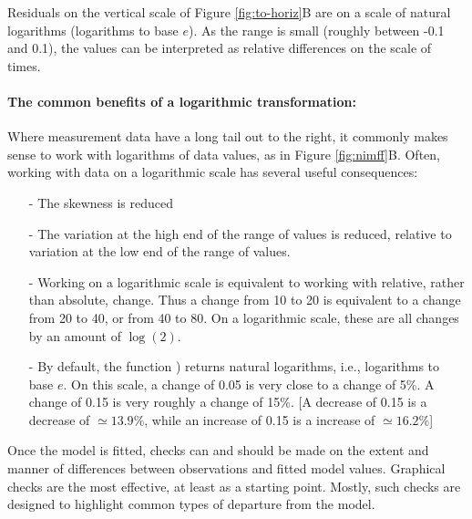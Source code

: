 Residuals on the vertical scale of Figure \ref{fig:to-horiz}B are on a
scale of natural logarithms (logarithms to base $e$).  As the range is
small (roughly between -0.1 and 0.1), the values can be interpreted as relative
differences on the scale of times.

\paragraph{The common benefits of a logarithmic transformation:}

Where measurement data have a long tail out to the right, it
commonly makes sense to work with logarithms of data values, as in Figure
\ref{fig:nimff}B.  Often, working with data on a logarithmic
scale has several useful consequences:
\begin{itemize}
  \item[-] The skewness is reduced
  \item[-] The variation at the high end of the range of values is reduced,
    relative to variation at the low end of the range of values.
  \item[-] Working on a logarithmic scale is equivalent to working
    with relative, rather than absolute, change.  Thus a change from
    10 to 20 is equivalent to a change from 20 to 40, or from 40 to 80.
    On a logarithmic scale, these are all changes by an amount of
    $\log(2)$.
  \item[-] By default, the function ) returns natural
    logarithms, i.e., logarithms to base $e$.  On this scale, a change
    of 0.05 is very close to a change of 5\%.  A change of 0.15 is
    very roughly a change of 15\%.  [A decrease of 0.15 is a decrease
    of $\simeq 13.9\%$, while an increase of 0.15 is a increase of
    $\simeq 16.2\%$]
\end{itemize}

Once the model is fitted, checks can and should be made on the extent
and manner of differences between observations and fitted model
values.  Graphical checks are the most effective, at least as a starting
point. Mostly, such checks are designed to highlight common types of
departure from the model.

